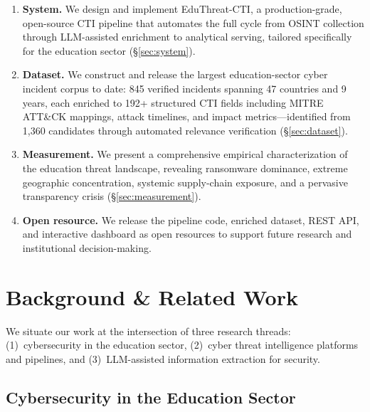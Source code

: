 \documentclass[sigconf,anonymous]{acmart}
\newcommand{\sys}{EduThreat-CTI\xspace}
\newcommand{\rawcollected}{1{,}360\xspace}       %
\newcommand{\numincidents}{845\xspace}            %
\newcommand{\numcountries}{47\xspace}
\begin{document}
\begin{enumerate}[leftmargin=*,nosep]
\item \textbf{System.} We design and implement \sys, a production-grade, open-source CTI pipeline that automates the full cycle from OSINT collection through LLM-assisted enrichment to analytical serving, tailored specifically for the education sector (\S\ref{sec:system}).

\item \textbf{Dataset.} We construct and release the largest education-sector cyber incident corpus to date: \numincidents verified incidents spanning \numcountries countries and 9 years, each enriched to 192+ structured CTI fields including MITRE ATT\&CK mappings, attack timelines, and impact metrics---identified from \rawcollected candidates through automated relevance verification (\S\ref{sec:dataset}).

\item \textbf{Measurement.} We present a comprehensive empirical characterization of the education threat landscape, revealing ransomware dominance, extreme geographic concentration, systemic supply-chain exposure, and a pervasive transparency crisis (\S\ref{sec:measurement}).

\item \textbf{Open resource.} We release the pipeline code, enriched dataset, REST API, and interactive dashboard as open resources to support future research and institutional decision-making.
\end{enumerate}


\section{Background \& Related Work}\label{sec:related}

We situate our work at the intersection of three research threads: (1)~cybersecurity in the education sector, (2)~cyber threat intelligence platforms and pipelines, and (3)~LLM-assisted information extraction for security.

\subsection{Cybersecurity in the Education Sector}\label{sec:related:edu}
\end{document}
